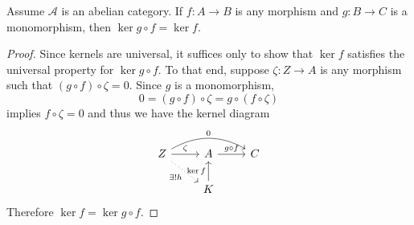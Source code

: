 \documentclass[10pt]{amsart}
\begin{document}
\begin{lem}\label{lem9}
  Assume $\mathcal{A}$ is an abelian category.
  If $f : A \rightarrow B$ is any morphism and $g : B \rightarrow C$ is a monomorphism, then $\ker g \circ f = \ker f$.

  \begin{proof}
    Since kernels are universal, it suffices only to show that $\ker f$ satisfies the universal property for $\ker g \circ f$.
    To that end, suppose $\zeta : Z \rightarrow A$ is any morphism such that $(g \circ f) \circ \zeta = 0$.
    Since $g$ is a monomorphism, 
    $$0 = (g \circ f) \circ \zeta = g \circ (f \circ \zeta)$$
    implies $f \circ \zeta = 0$ and thus we have the kernel diagram
    $$\begin{tikzcd}
      Z \arrow[dotted,swap]{rd}{\exists !h} \arrow{r}{\zeta}\arrow[bend left]{rr}{0} & A \arrow{r}{g \circ f} & C\\
      & K\arrow{u}{\ker f} &
    \end{tikzcd}$$
    Therefore $\ker f = \ker g \circ f$.
  \end{proof}
\end{lem}
\end{document}
